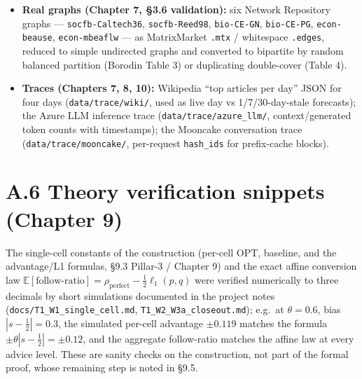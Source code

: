 \begin{itemize}
\tightlist
\item
  \textbf{Real graphs (Chapter 7, §3.6 validation):} six Network Repository graphs ---
  \texttt{socfb-Caltech36}, \texttt{socfb-Reed98}, \texttt{bio-CE-GN}, \texttt{bio-CE-PG}, \texttt{econ-beause},
  \texttt{econ-mbeaflw} --- as MatrixMarket \texttt{.mtx} / whitespace \texttt{.edges}, reduced to simple
  undirected graphs and converted to bipartite by random balanced partition (Borodin
  Table 3) or duplicating double-cover (Table 4).
\item
  \textbf{Traces (Chapters 7, 8, 10):} Wikipedia ``top articles per day'' JSON for four days
  (\texttt{data/trace/wiki/}, used as live day vs 1/7/30-day-stale forecasts); the Azure LLM
  inference trace (\texttt{data/trace/azure\_llm/}, context/generated token counts with
  timestamps); the Mooncake conversation trace (\texttt{data/trace/mooncake/}, per-request
  \texttt{hash\_ids} for prefix-cache blocks).
\end{itemize}

\section{A.6 Theory verification snippets (Chapter 9)}\label{a.6-theory-verification-snippets-chapter-9}

The single-cell constants of the construction (per-cell OPT, baseline, and the
advantage/L1 formulas, §9.3 Pillar-3 / Chapter 9) and the exact affine conversion law
\(\mathbb E[\text{follow-ratio}] = \rho_{\mathrm{perfect}} - \tfrac12\ell_1(p,q)\) were
verified numerically to three decimals by short simulations documented in the project notes
(\texttt{docs/T1\_W1\_single\_cell.md}, \texttt{T1\_W2\_W3a\_closeout.md}); e.g.~at \(\theta=0.6\), bias
\(|s-\tfrac12|=0.3\), the simulated per-cell advantage \(\pm0.119\) matches the formula
\(\pm\theta|s-\tfrac12|=\pm0.12\), and the aggregate follow-ratio matches the affine law at
every advice level. These are sanity checks on the construction, not part of the formal
proof, whose remaining step is noted in §9.5.
